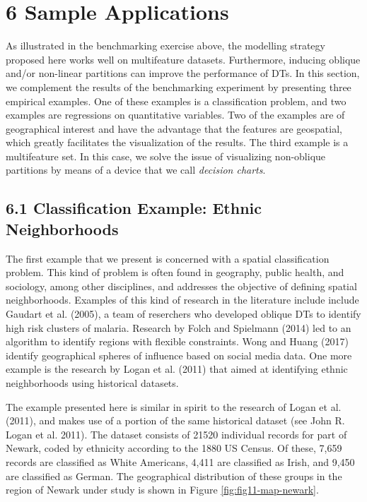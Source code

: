 \documentclass[]{elsarticle} %
\begin{document}
\section{6 Sample Applications}\label{sample-applications}

As illustrated in the benchmarking exercise above, the modelling
strategy proposed here works well on multifeature datasets. Furthermore,
inducing oblique and/or non-linear partitions can improve the
performance of DTs. In this section, we complement the results of the
benchmarking experiment by presenting three empirical examples. One of
these examples is a classification problem, and two examples are
regressions on quantitative variables. Two of the examples are of
geographical interest and have the advantage that the features are
geospatial, which greatly facilitates the visualization of the results.
The third example is a multifeature set. In this case, we solve the
issue of visualizing non-oblique partitions by means of a device that we
call \emph{decision charts}.

\subsection{6.1 Classification Example: Ethnic
Neighborhoods}\label{classification-example-ethnic-neighborhoods}

The first example that we present is concerned with a spatial
classification problem. This kind of problem is often found in
geography, public health, and sociology, among other disciplines, and
addresses the objective of defining spatial neighborhoods. Examples of
this kind of research in the literature include include Gaudart et al.
(2005), a team of reserchers who developed oblique DTs to identify high
risk clusters of malaria. Research by Folch and Spielmann (2014) led to
an algorithm to identify regions with flexible constraints. Wong and
Huang (2017) identify geographical spheres of influence based on social
media data. One more example is the research by Logan et al. (2011) that
aimed at identifying ethnic neighborhoods using historical datasets.

The example presented here is similar in spirit to the research of Logan
et al. (2011), and makes use of a portion of the same historical dataset
(see John R. Logan et al. 2011). The dataset consists of 21520
individual records for part of Newark, coded by ethnicity according to
the 1880 US Census. Of these, 7,659 records are classified as White
Americans, 4,411 are classified as Irish, and 9,450 are classified as
German. The geographical distribution of these groups in the region of
Newark under study is shown in Figure \ref{fig:fig11-map-newark}.
\end{document}
